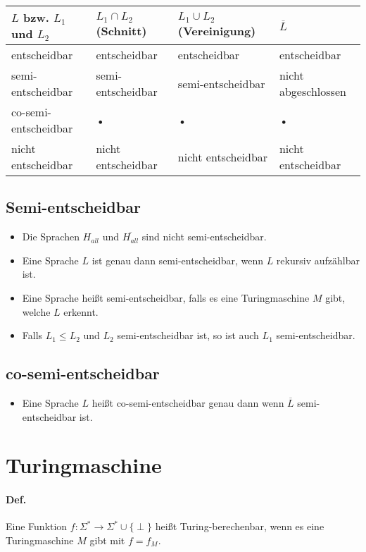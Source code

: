 \begin{table}[htb!]
\centering
\begin{tabular}{l|l|l|l}
$L$ bzw. $L_1$ und $L_2$ & $L_1 \cap L_2$ (Schnitt) & $L_1 \cup L_2$ (Vereinigung) & $\overline{L}$ \\
\hline
entscheidbar & entscheidbar & entscheidbar & entscheidbar \\
semi-entscheidbar & semi-entscheidbar & semi-entscheidbar & nicht abgeschlossen \\
co-semi-entscheidbar & • & • & • \\
nicht entscheidbar & nicht entscheidbar & nicht entscheidbar & nicht entscheidbar \\
\end{tabular} 
\end{table}

\subsection{Semi-entscheidbar}

\begin{itemize}
	\item Die Sprachen $H_{all}$ und $\overline{H_{all}}$ sind nicht semi-entscheidbar.
	\item Eine Sprache $L$ ist genau dann semi-entscheidbar, wenn $L$ rekursiv aufzählbar ist.
	\item Eine Sprache heißt semi-entscheidbar, falls es eine Turingmaschine $M$ gibt, welche $L$ erkennt.
	\item Falls $L_1 \leq L_2$ und $L_2$ semi-entscheidbar ist, so ist auch $L_1$ semi-entscheidbar.
\end{itemize}

\subsection{co-semi-entscheidbar}

\begin{itemize}
	\item Eine Sprache $L$ heißt co-semi-entscheidbar genau dann wenn $\overline{L}$ semi-entscheidbar ist.
\end{itemize}


\section{Turingmaschine}
\paragraph*{Def.} Eine Funktion $f:\Sigma^* \rightarrow\Sigma^* \cup \{ \perp \}$ heißt Turing-berechenbar, wenn es eine Turingmaschine $M$ gibt mit $f=f_M$.
